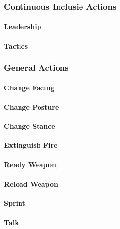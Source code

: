 \subsubsection{Continuous Inclusie Actions}

\paragraph{Leadership}

\paragraph{Tactics}

\subsubsection{General Actions}

\paragraph{Change Facing}

\paragraph{Change Posture}

\paragraph{Change Stance}

\paragraph{Extinguish Fire}

\paragraph{Ready Weapon}

\paragraph{Reload Weapon}

\paragraph{Sprint}

\paragraph{Talk}

